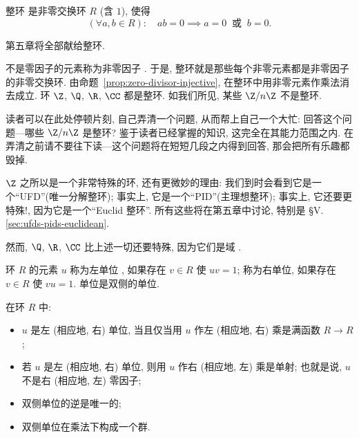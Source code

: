 \begin{definition}
\label{def:integral-domain}
整环%
是非零交换环 $R$ (含 $1$), 使得
\[
(\forall a, b \in R): \quad ab = 0 \implies a = 0 \ \text{ 或 } \ b = 0.
\]
\end{definition}

第五章将全部献给整环.

不是零因子的元素称为非零因子%
. 于是, 整环就是那些每个非零元素都是非零因子的非零交换环. 由命题~\ref{prop:zero-divisor-injective}, 在整环中用非零元素作乘法消去成立. 环 $\Z$, $\Q$, $\R$, $\CC$ 都是整环. 如我们所见, 某些 $\Z/n\Z$ 不是整环.

读者可以在此处停顿片刻, 自己弄清一个问题, 从而帮上自己一个大忙: 回答这个问题---哪些 $\Z/n\Z$ 是整环? 鉴于读者已经掌握的知识, 这完全在其能力范围之内. 在弄清之前请不要往下读---这个问题将在短短几段之内得到回答, 那会把所有乐趣都毁掉.

$\Z$ 之所以是一个非常特殊的环, 还有更微妙的理由: 我们到时会看到它是一个``UFD''(唯一分解整环); 事实上, 它是一个``PID''(主理想整环); 事实上, 它还要更特殊!, 因为它是一个``Euclid 整环''. 所有这些将在第五章中讨论, 特别是 \S V.\ref{sec:ufds-pids-euclidean}.

然而, $\Q$, $\R$, $\CC$ 比上述一切还要特殊, 因为它们是域%
.

\begin{definition}
\label{def:units}
环 $R$ 的元素 $u$ 称为左单位%
, 如果存在 $v \in R$ 使 $uv = 1$; 称为右单位, 如果存在 $v \in R$ 使 $vu = 1$. 单位是双侧的单位.
\end{definition}

\begin{proposition}
\label{prop:units-surjective}
在环 $R$ 中:
\begin{itemize}
	\item $u$ 是左 (相应地, 右) 单位, 当且仅当用 $u$ 作左 (相应地, 右) 乘是满函数 $R \to R$;
	\item 若 $u$ 是左 (相应地, 右) 单位, 则用 $u$ 作右 (相应地, 左) 乘是单射; 也就是说, $u$ 不是右 (相应地, 左) 零因子;
	\item 双侧单位的逆是唯一的;
	\item 双侧单位在乘法下构成一个群.
\end{itemize}
\end{proposition}

